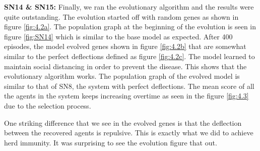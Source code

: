 \documentclass[a4paper,11pt]{article}
\begin{document}
    {\bf SN14 \& SN15:} Finally, we ran the evolutionary algorithm and the results were quite outstanding. The evolution started off with random genes as shown in figure \ref{fig:4.2a}. The population graph at the beginning of the evolution is seen in figure \ref{fig:SN14} which is similar to the base model as expected. After 400 episodes, the model evolved genes shown in figure \ref{fig:4.2b} that are somewhat similar to the perfect deflections defined as figure \ref{fig:4.2c}. The model learned to maintain social distancing in order to prevent the disease. This shows that the evolutionary algorithm works. The population graph of the evolved model is similar to that of SN8, the system with perfect deflections. The mean score of all the agents in the system keeps increasing overtime as seen in the figure \ref{fig:4.3} due to the selection process.

    One striking difference that we see in the evolved genes is that the deflection between the recovered agents is repulsive. This is exactly what we did to achieve herd immunity. It was surprising to see the evolution figure that out.
\end{document}
